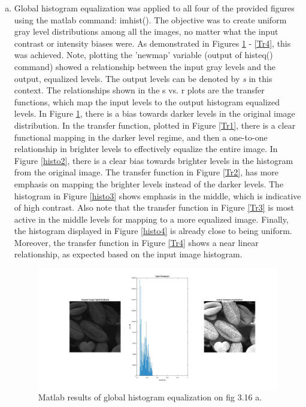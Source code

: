 \documentclass[./rarnold_report2.tex]{subfiles}
\begin{document}
\begin{enumerate}[a.]
	\item 
	\noindent Global histogram equalization was applied to all four of the provided figures using the matlab command: imhist().  The objective was to create uniform gray level distributions among all the images, no matter what the input contrast or intensity biases were.  As demonstrated in Figures \ref{histo1} - \ref{Tr4}, this was achieved.  Note, plotting the 'newmap' variable (output of histeq() command) showed a relationship between the input gray levels and the output, equalized levels. The output levels can be denoted by \textit{s} in this context.  The relationships shown in the s vs. r plots are the transfer functions, which map the input levels to the output histogram equalized levels. In Figure \ref{histo1}, there is a bias towards darker levels in the original image distribution.  In the transfer function, plotted in Figure \ref{Tr1}, there is a clear functional mapping in the darker level regime, and then a one-to-one relationship in brighter levels to effectively equalize the entire image.  In Figure \ref{histo2}, there is a clear bias towards brighter levels in the histogram from the original image.  The transfer function in Figure \ref{Tr2}, has more emphasis on mapping the brighter levels instead of the darker levels.  The histogram in Figure \ref{histo3} shows emphasis in the middle, which is indicative of high contrast.  Also note that the transfer function in Figure \ref{Tr3} is most active in the middle levels for mapping to a more equalized image.  Finally, the histogram displayed in Figure \ref{histo4} is already close to being uniform.  Moreover, the transfer function in Figure \ref{Tr4} shows a near linear relationship, as expected based on the input image histogram.
\clearpage

	\begin{figure}[!htbp]
	\centering
	\includegraphics[scale=0.25]{"histo1"}
	\caption{Matlab results of global histogram equalization on fig 3.16 a.} 
	\label{histo1}
	\end{figure}
	

\end{enumerate}
\end{document}
